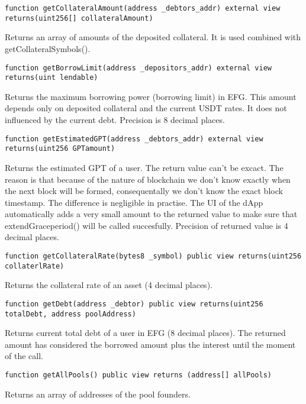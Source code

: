 \documentclass{article}
\begin{document}
\begin{lstlisting}[language=Solidity,numbers=none,escapechar=@]
 function getCollateralAmount(address _debtors_addr) external view returns(uint256[] collateralAmount)
\end{lstlisting}
Returns an array of amounts of the deposited collateral. It is used combined with getCollateralSymbols().

\begin{lstlisting}[language=Solidity,numbers=none,escapechar=@]
 function getBorrowLimit(address _depositors_addr) external view returns(uint lendable)
\end{lstlisting}
Returns the maximum borrowing power (borrowing limit) in EFG. This amount depends only on deposited collateral and the current USDT rates. It does not influenced by the current debt. Precision is 8 decimal places.
\begin{lstlisting}[language=Solidity,numbers=none,escapechar=@]
 function getEstimatedGPT(address _debtors_addr) external view returns(uint256 GPTamount)
\end{lstlisting}
Returns the estimated GPT of a user. The return value can't be excact. The reason is that because of the nature of blockchain we don't know exactly when the next block will be formed, consequentally we don't know the exact block timestamp. The difference is negligible in practise. The UI of the dApp automatically adds a very small amount to the returned value to make sure that extendGraceperiod() will be called succesfully. Precision of returned value is 4 decimal places.

\begin{lstlisting}[language=Solidity,numbers=none,escapechar=@]
 function getCollateralRate(bytes8 _symbol) public view returns(uint256 collaterlRate)
\end{lstlisting}
Returns the collateral rate of an asset (4 decimal places).

\begin{lstlisting}[language=Solidity,numbers=none,escapechar=@]
 function getDebt(address _debtor) public view returns(uint256 totalDebt, address poolAddress)
\end{lstlisting}
Returns current total debt of a user in EFG (8 decimal places). The returned amount has considered the borrowed amount plus the interest until the moment of the call.

\begin{lstlisting}[language=Solidity,numbers=none,escapechar=@]
 function getAllPools() public view returns (address[] allPools)
\end{lstlisting}
Returns an array of addresses of the pool founders.
\end{document}
